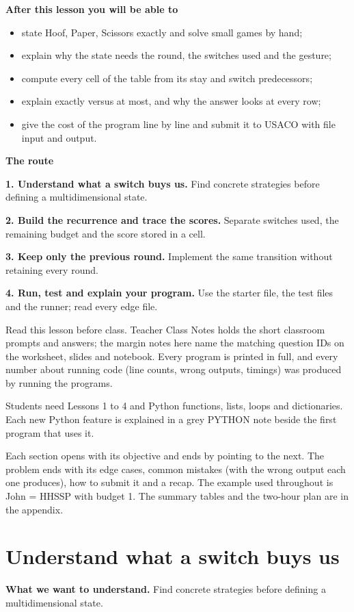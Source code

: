 \documentclass[11pt,a4paper,oneside]{report}
\newcommand{\readinggoal}[1]{\par\textbf{What we want to understand.} #1\par\smallskip}
\begin{document}
\textbf{After this lesson you will be able to}\begin{itemize}\item state Hoof, Paper, Scissors exactly and solve small games by hand;\item explain why the state needs the round, the switches used and the gesture;\item compute every cell of the table from its stay and switch predecessors;\item explain exactly versus at most, and why the answer looks at every row;\item give the cost of the program line by line and submit it to USACO with file input and output.\end{itemize}
\textbf{The route}\par
\textbf{1. Understand what a switch buys us.} Find concrete strategies before defining a multidimensional state.\par
\textbf{2. Build the recurrence and trace the scores.} Separate switches used, the remaining budget and the score stored in a cell.\par
\textbf{3. Keep only the previous round.} Implement the same transition without retaining every round.\par
\textbf{4. Run, test and explain your program.} Use the starter file, the test files and the runner; read every edge file.\par
Read this lesson before class. Teacher Class Notes holds the short classroom prompts and answers; the margin notes here name the matching question IDs on the worksheet, slides and notebook. Every program is printed in full, and every number about running code (line counts, wrong outputs, timings) was produced by running the programs.

Students need Lessons 1 to 4 and Python functions, lists, loops and dictionaries. Each new Python feature is explained in a grey PYTHON note beside the first program that uses it.

Each section opens with its objective and ends by pointing to the next. The problem ends with its edge cases, common mistakes (with the wrong output each one produces), how to submit it and a recap. The example used throughout is John = HHSSP with budget 1. The summary tables and the two-hour plan are in the appendix.


\chapter{Understand what a switch buys us}
\readinggoal{Find concrete strategies before defining a multidimensional state.}
\end{document}
